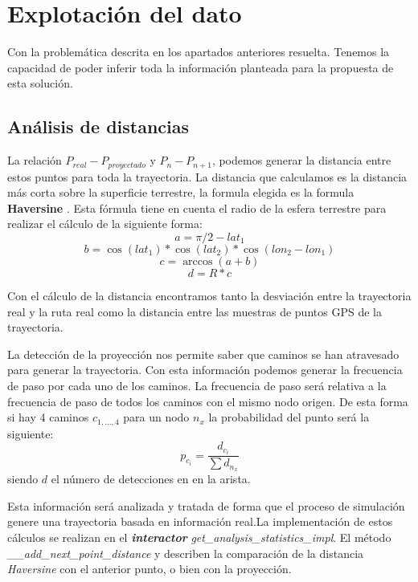 \section{Explotación del dato}
\label{section:ExplotacionDato}
Con la problemática descrita en los apartados anteriores resuelta. Tenemos la capacidad de poder inferir 
toda la información  planteada para la propuesta de esta solución.

\subsection{Análisis de distancias}
\label{section: AnalisisDistancias}
La relación $P_{real} - P_{proyectado}$ y $P_{n} - P_{n+1}$, podemos generar la distancia entre estos puntos 
para toda la trayectoria. La distancia que calculamos es la distancia más corta sobre la superficie terrestre, 
la formula elegida es la formula \textbf{Haversine} \cite{Gis01} \cite{Haver01}. Esta fórmula tiene en cuenta 
el radio de la esfera terrestre para realizar el cálculo de la siguiente forma:
\begin{equation}
a = \pi/2 - lat_{1}
\end{equation}
\begin{equation}
b = \cos(lat_{1}) * \cos(lat_{2}) * \cos(lon_{2} - lon_{1})
\end{equation}
\begin{equation}
c = \arccos(a + b)
\end{equation}
\begin{equation}
d = R * c
\end{equation}

Con el cálculo de la distancia encontramos tanto la desviación entre la trayectoria real y la ruta real como 
la distancia entre las muestras de puntos \ac{GPS} de la trayectoria.


La detección de la proyección nos permite saber que caminos se han atravesado para generar la 
trayectoria. Con esta información podemos generar la frecuencia de paso por cada uno de los
caminos. La frecuencia de paso será relativa a la frecuencia de paso de todos los caminos con el mismo 
nodo origen. De esta forma si hay 4 caminos $c_{1,...,4}$ para un nodo $n_{x}$ la probabilidad del punto 
será la siguiente:
\begin{equation}
p_{c_{i}} = \frac{d_{c_{i}}}{\sum{d_{n_{x}}}}
\end{equation}
siendo $d$ el número de detecciones en en la arista.

Esta información será analizada y tratada de forma que el proceso de simulación genere una trayectoria 
basada en información real.La implementación de estos cálculos se realizan en el \textbf{\textit{interactor}}
\textit{get\_analysis\_statistics\_impl}. El método \textit{\_\_add\_next\_point\_distance} y describen la 
comparación de la distancia \textit{Haversine} con el anterior punto, o bien con la proyección.


